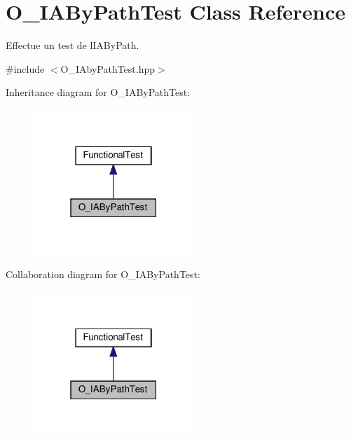 \hypertarget{classO__IAByPathTest}{}\section{O\+\_\+\+I\+A\+By\+Path\+Test Class Reference}
\label{classO__IAByPathTest}


Effectue un test de l\textquotesingle{}I\+A\+By\+Path.  




{\ttfamily \#include $<$O\+\_\+\+I\+Aby\+Path\+Test.\+hpp$>$}



Inheritance diagram for O\+\_\+\+I\+A\+By\+Path\+Test\+:
\nopagebreak
\begin{figure}[H]
\begin{center}
\leavevmode
\includegraphics[width=171pt]{classO__IAByPathTest__inherit__graph}
\end{center}
\end{figure}


Collaboration diagram for O\+\_\+\+I\+A\+By\+Path\+Test\+:
\nopagebreak
\begin{figure}[H]
\begin{center}
\leavevmode
\includegraphics[width=171pt]{classO__IAByPathTest__coll__graph}
\end{center}
\end{figure}
